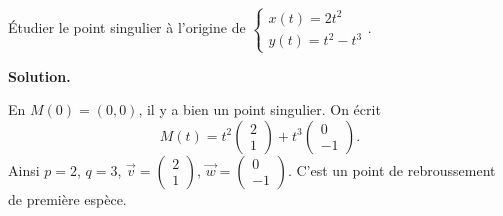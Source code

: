 \documentclass[class=report,crop=false]{standalone}
\begin{document}
\begin{exemple}
Étudier le point singulier à l'origine de
$\left\{\begin{array}{l} x(t) = 2t^2\\ y(t) = t^2 - t^3\end{array}\right..$

\medskip
\textbf{Solution.}

En $M(0)=(0,0)$, il y a bien un point singulier.
On écrit
$$M(t) = t^2 \begin{pmatrix}2\\1\end{pmatrix} + t^3
\begin{pmatrix}0\\-1\end{pmatrix}.$$
Ainsi $p=2$, $q=3$,
$\vec{v}=\left(\begin{smallmatrix}2\\1\end{smallmatrix}\right)$,
$\vec{w}=\left(\begin{smallmatrix}0\\-1\end{smallmatrix}\right)$.
C'est un point de rebroussement de première espèce.


\end{exemple}
\end{document}
